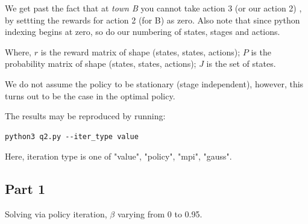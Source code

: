We get past the fact that at \textit{town B } you cannot take action 3 (or our action 2) , by settting the rewards for action 2 (for B) as zero. Also note that since python indexing begins at zero, so do our numbering of states, stages and actions.

Where, $r$ is the reward matrix of shape (states, states, actions);
$P$ is the probability matrix of shape (states, states, actions);
$J$ is the set of states.

We do not assume the policy to be stationary (stage independent), however, this turns out to be the case in the optimal policy.

The results may be reproduced by running:
\begin{lstlisting}[numbers = none]
python3 q2.py --iter_type value
\end{lstlisting}

Here, iteration type is one of "value", "policy", "mpi", "gauss".

\subsection{Part 1}

Solving via policy iteration, $\beta$ varying from 0 to 0.95.

